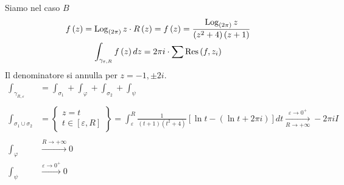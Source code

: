 Siamo nel caso $B$
\begin{gather*}
f\left(z\right) = \operatorname{Log}_{\left(2\pi \right)} z\cdot R\left(z\right) = f\left(z\right) = \frac{\operatorname{Log}_{\left(2\pi \right)} z}{\left(z^{2} + 4\right)\left(z + 1\right)}\\
\int _{\gamma _{\varepsilon ,R}} f\left(z\right) dz = 2\pi i\cdot \sum \operatorname{Res} \left(f,z_{i}\right)
\end{gather*}
Il denominatore si annulla per $z = -1,\pm 2i$.
\begin{equation*}
\begin{aligned}
\int _{\gamma _{R,\varepsilon }} & = \int _{\sigma _{1}} + \int _{\varphi } + \int _{\sigma _{2}} + \int _{\psi }\\
 & \\
\int _{\sigma _{1} \cup \sigma _{2}} & = \left\{\begin{array}{ c }
z = t\\
t\in \left[ \varepsilon ,R\right]
\end{array}\right\} = \int ^{R}_{\varepsilon }\frac{1}{\left(t + 1\right)\left(t^{2} + 4\right)}\left[\ln t - \left(\ln t + 2\pi i\right)\right] dt\xrightarrow[R\rightarrow + \infty ]{\varepsilon \rightarrow 0^{ + }} - 2\pi iI\\
 & \\
\int _{\varphi } & \xrightarrow{R\rightarrow + \infty } 0\\
\int _{\psi } & \xrightarrow{\varepsilon \rightarrow 0^{ + }} 0
\end{aligned}
\end{equation*}
\Soluzione

